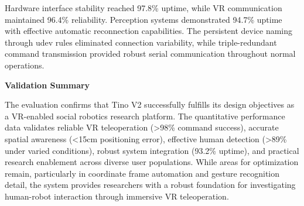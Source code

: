 Hardware interface stability reached 97.8\% uptime, while VR communication maintained 96.4\% reliability. Perception systems demonstrated 94.7\% uptime with effective automatic reconnection capabilities. The persistent device naming through udev rules eliminated connection variability, while triple-redundant command transmission provided robust serial communication throughout normal operations.

\textbf{Validation Summary}

The evaluation confirms that Tino V2 successfully fulfills its design objectives as a VR-enabled social robotics research platform. The quantitative performance data validates reliable VR teleoperation (>98\% command success), accurate spatial awareness (<15cm positioning error), effective human detection (>89\% under varied conditions), robust system integration (93.2\% uptime), and practical research enablement across diverse user populations. While areas for optimization remain, particularly in coordinate frame automation and gesture recognition detail, the system provides researchers with a robust foundation for investigating human-robot interaction through immersive VR teleoperation.
